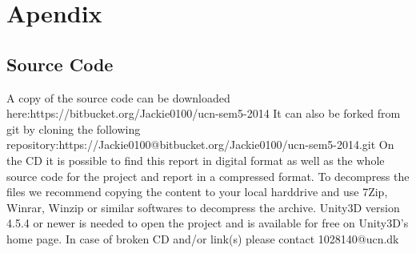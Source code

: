 \chapter*{Apendix}
\section*{Source Code}

A copy of the source code can be downloaded here:\newline https://bitbucket.org/Jackie0100/ucn-sem5-2014
\newline
\newline
It can also be forked from git by cloning the following repository:\newline https://Jackie0100@bitbucket.org/Jackie0100/ucn-sem5-2014.git
\newline
\newline
On the CD it is possible to find this report in digital format as well as the whole source code for the project and report in a compressed format. To decompress the files we recommend copying the content to your local harddrive and use 7Zip, Winrar, Winzip or similar softwares to decompress the archive.
\newline
\newline
Unity3D version 4.5.4 or newer is needed to open the project and is available for free on Unity3D's home page.
\newline
\newline
In case of broken CD and/or link(s) please contact 1028140@ucn.dk
\newline
\newline
\newline